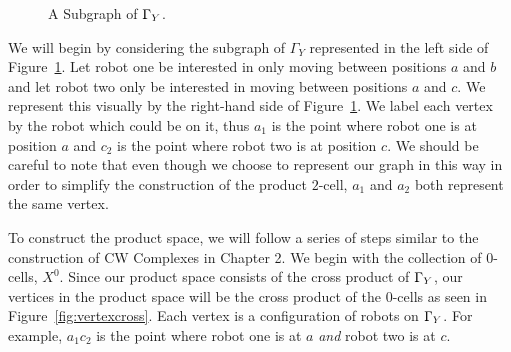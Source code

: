 \begin{figure}[h]
\caption{A Subgraph of $\Gamma_Y$.}\label{fig:subgraph}
\centering
{}
\hspace{1in}
\end{figure}

We will begin by considering the subgraph of $\Gamma_{Y}$ represented in the left side of Figure~\ref{fig:subgraph}. Let robot one be interested in only moving between positions $a$ and $b$ and let robot two only be interested in moving between positions $a$ and $c$. We represent this visually by the right-hand side of Figure~\ref{fig:subgraph}. We label each vertex by the robot which could be on it, thus $a_1$ is the point where robot one is at position $a$ and $c_2$ is the point where robot two is at position $c$. We should be careful to note that even though we choose to represent our graph in this way in order to simplify the construction of the product $2$-cell, $a_1$ and $a_2$ both represent the same vertex.

To construct the product space, we will follow a series of steps similar to the construction of CW Complexes in Chapter 2. We begin with the collection of $0$-cells, $X^0$. Since our product space consists of the cross product of $\Gamma_Y$, our vertices in the product space will be the cross product of the $0$-cells as seen in Figure~\ref{fig:vertexcross}. Each vertex is a configuration of robots on $\Gamma_Y$. For example, $a_1c_2$ is the point where robot one is at $a$ \textit{and} robot two is at $c$.


